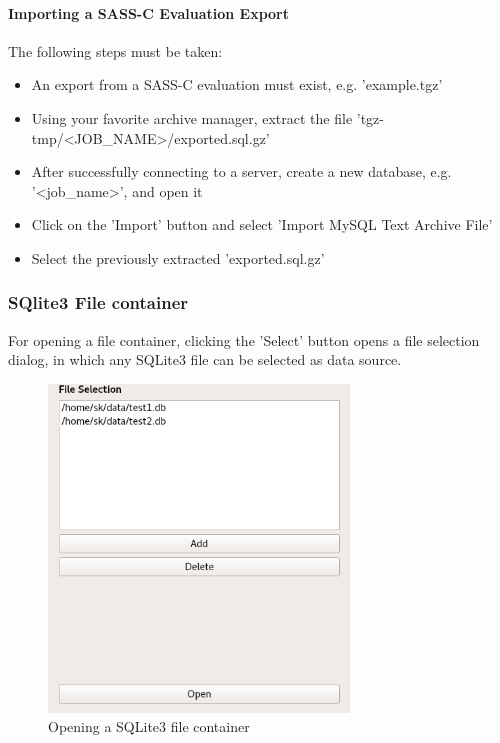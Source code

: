 \paragraph{Importing a SASS-C Evaluation Export}

The following steps must be taken:

\begin{itemize}  
\item An export from a SASS-C evaluation must exist, e.g. 'example.tgz'
\item Using your favorite archive manager, extract the file 'tgz-tmp/<JOB\_NAME>/exported.sql.gz'
\item After successfully connecting to a server, create a new database, e.g. '<job\_name>', and open it
\item Click on the 'Import' button and select 'Import MySQL Text Archive File'
\item Select the previously extracted 'exported.sql.gz'
\end{itemize}

\subsubsection{SQlite3 File container}
\label{sec:sqlite_fc}
For opening a file container, clicking the 'Select' button opens a file selection dialog, in which any SQLite3 file can be selected as data source.

\begin{figure}[H]
  \center
    \includegraphics[width=8cm,frame]{../screenshots/sqlite3_open.png}
  \caption{Opening a SQLite3 file container}
  \label{fig:sqlite3_open}
\end{figure}

